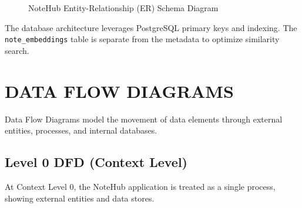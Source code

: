 \documentclass[12,Times new Roman,a4paper]{report}
\begin{document}
\begin{figure}[H]
{%
}
\caption{NoteHub Entity-Relationship (ER) Schema Diagram}
\label{fig:er_diagram}
\end{figure}

The database architecture leverages PostgreSQL primary keys and indexing. The \texttt{note\_embeddings} table is separate from the metadata to optimize similarity search.

\section{DATA FLOW DIAGRAMS}
Data Flow Diagrams model the movement of data elements through external entities, processes, and internal databases.

\subsection{Level 0 DFD (Context Level)}
At Context Level 0, the NoteHub application is treated as a single process, showing external entities and data stores.
\end{document}
